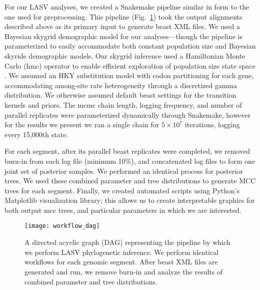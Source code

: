 For our LASV analyses, we created a Snakemake pipeline similar in form to the one used for preprocessing.
This pipeline (Fig.~\ref{fig:workflow_dag}) took the output alignments described above as its primary input to generate \gls{beast} XML files.
We used a Bayesian skygrid demographic model for our analyses---though the pipeline is parameterized to easily accommodate both constant population size and Bayesian skyride \cite{minin2008smooth} demographic models.
Our skygrid inference used a Hamiltonian Monte Carlo (\gls{hmc}) operator to enable efficient exploration of population size state space \cite{baele2020hamiltonian}.
We assumed an HKY substitution model with codon partitioning for each gene, accommodating among-site rate heterogeneity through a discretized gamma distribution.
We otherwise assumed default \gls{beast} settings for the transition kernels and priors.
The \gls{mcmc} chain length, logging frequency, and number of parallel replicates were parameterized dynamically through Snakemake, however for the results we present we ran a single chain for $5\times10^7$ iterations, logging every 15,000th state.

For each segment, after its parallel \gls{beast} replicates were completed, we removed burn-in from each log file (minimum 10\%), and concatenated log files to form one joint set of posterior samples.
We performed an identical process for posterior trees. %
We used these combined parameter and tree distributions to generate MCC trees for each segment.
Finally, we created automated scripts using Python's Matplotlib \cite{hunter2007matplotlib} visualization library; this allows us to create interpretable graphics for both output \gls{mcc} trees, and particular parameters in which we are interested.

\begin{figure}[ht]
  \centering
  \medskip
  \texttt{[image: workflow\_dag]}
  \caption[LASV phylogenetics pipeline]{A directed acyclic graph (DAG) representing the pipeline by which we perform LASV phylogenetic inference. We perform identical workflows for each genomic segment. After \gls{beast} XML files are generated and run, we remove burn-in and analyze the results of combined parameter and tree distributions.}
  \label{fig:workflow_dag}
\end{figure}


